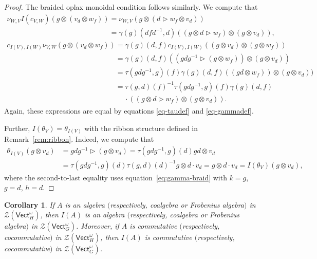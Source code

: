 \documentclass[pdftex]{sigma}
\numberwithin{equation}{section}
\newtheorem{Corollary}[Theorem]{Corollary}
\newcommand{\Vect}{\mathsf{Vect}}
\newcommand{\cZ}{\mathcal{Z}}
\newcommand{\rI}{I}
\begin{document}
\begin{proof}
The braided oplax monoidal condition follows similarly. We compute that
\begin{gather*}
 \nu_{W,V}\rI(c_{V,W})(g \otimes (v_d \otimes w_f)) = \nu_{W,V}(g \otimes (d \vartriangleright w_f \otimes v_d)) \\
\phantom{ \nu_{W,V}\rI(c_{V,W})(g \otimes (v_d \otimes w_f))}{} = \gamma(g)(dfd^{-1},d)((g\otimes d \vartriangleright w_f) \otimes (g \otimes v_d)), \\
 c_{\rI(V),\rI(W)}\nu_{V,W} (g \otimes (v_d \otimes w_f)) = \gamma(g)(d,f) c_{\rI(V),\rI(W)} ((g \otimes v_d) \otimes (g \otimes w_f)) \\
\phantom{ c_{\rI(V),\rI(W)}\nu_{V,W} (g \otimes (v_d \otimes w_f)) }{} = \gamma(g)(d,f) ((gdg^{-1} \vartriangleright (g \otimes w_f)) \otimes (g \otimes v_d)) \\
 \phantom{ c_{\rI(V),\rI(W)}\nu_{V,W} (g \otimes (v_d \otimes w_f)) }{}= \tau(gdg^{-1},g)(f) \gamma(g)(d,f) ((gd \otimes w_f)) \otimes (g \otimes v_d)) \\
\phantom{ c_{\rI(V),\rI(W)}\nu_{V,W} (g \otimes (v_d \otimes w_f)) }{} = \tau(g,d)(f)^{-1}\tau(gdg^{-1},g)(f) \gamma(g)(d,f)\\
\phantom{ c_{\rI(V),\rI(W)}\nu_{V,W} (g \otimes (v_d \otimes w_f)) }{}\quad\ \cdot((g\otimes d \vartriangleright w_f) \otimes (g \otimes v_d)).
\end{gather*}
Again, these expressions are equal by equations \eqref{eq-taudef} and \eqref{eq-gammadef}.

Further, $I(\theta_V)=\theta_{I(V)}$ with the ribbon structure defined in Remark~\ref{rem:ribbon}.
 Indeed, we compute that
 \begin{align*}
 \theta_{I(V)}(g\otimes v_d)&=gdg^{-1}\vartriangleright (g\otimes v_d)
 =\tau(gdg^{-1},g)(d)gd\otimes v_d\\
 &=\tau(gdg^{-1},g)(d)\tau(g,d)(d)^{-1} g\otimes d\cdot v_d
 =g\otimes d\cdot v_d=I(\theta_V)(g\otimes v_d),
 \end{align*}
 where the second-to-last equality uses equation~\eqref{eq:gamma-braid} with $k=g$, $g=d$, $h=d$.
\end{proof}

\begin{Corollary}\label{cor:Ipreserves}
If $A$ is an algebra $($respectively, coalgebra or Frobenius algebra$)$ in $\cZ( \Vect_H^\omega)$, then $\rI(A)$ is an algebra $($respectively, coalgebra or Frobenius algebra$)$ in $\cZ( \Vect_G^\omega)$. Moreover, if $A$ is commutative $($respectively, cocommutative$)$ in $\cZ( \Vect_H^\omega)$, then $\rI(A)$ is commutative $($respectively, cocommutative$)$ in $\cZ( \Vect_G^\omega)$.
\end{Corollary}
\end{document}

